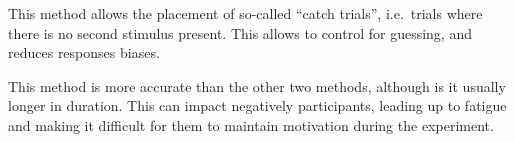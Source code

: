 This method allows the placement of so-called ``catch trials'', i.e.\ trials
where there is no second stimulus present. This allows to control for guessing,
and reduces responses biases.

This method is more accurate than the other two methods, although is it usually
longer in duration. This can impact negatively participants, leading up to
fatigue and making it difficult for them to maintain motivation during the
experiment.
